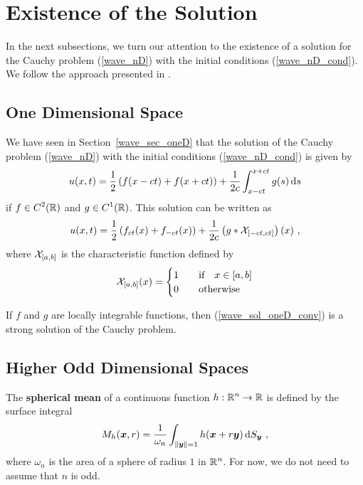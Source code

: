 \section{Existence of the Solution} \label{SectWavenDExSol}

In the next subsections, we turn our attention to the existence of a
solution for the Cauchy problem (\ref{wave_nD}) with the initial conditions
(\ref{wave_nD_cond}).  We follow the approach presented in \cite{FoPDE}.

\subsection{One Dimensional Space}

We have seen in Section~\ref{wave_sec_oneD} that the solution of the
Cauchy problem (\ref{wave_nD}) with the initial conditions
(\ref{wave_nD_cond}) is given by
\[
u(x,t) = \frac{1}{2} \left(f(x-ct) + f(x+ct)\right)
+ \frac{1}{2c} \int_{x-ct}^{x+ct} g(s)\,\mathrm{d}{s}
\]
if $\displaystyle f \in C^2(\mathbb{R})$ and $\displaystyle g \in C^1(\mathbb{R})$.
This solution can be written as
\begin{equation} \label{wave_sol_oneD_conv}
u(x,t) = \frac{1}{2} \left( f_{ct}(x) + f_{-ct}(x) \right) +
\frac{1}{2c} \left(g \ast \mathcal{X}_{[-ct,ct]}\right)(x) \ ,
\end{equation}
where $\mathcal{X}_{[a,b]}$ is the characteristic function defined by
\[
\mathcal{X}_{[a,b]}(x) = \begin{cases}
1 & \quad \text{if} \quad x \in [a,b] \\
0 & \quad \text{otherwise}
\end{cases}
\]

If $f$ and $g$ are locally integrable functions, then
(\ref{wave_sol_oneD_conv}) is a strong solution of the Cauchy problem.

\subsection{Higher Odd Dimensional Spaces} \label{wave_HODS}

The {\bfseries spherical mean} of a continuous function
$\displaystyle h:\mathbb{R}^n\rightarrow \mathbb{R}$ is defined by the surface integral
\begin{equation} \label{wave_nD_idx1}
M_h({\bm{x}},r) = \frac{1}{\omega_n} \int_{\|{\bm{y}}\|=1} h({\bm{x}} + r {\bm{y}}) 
\,\mathrm{d}{S}_{{\bm{y}}} \ ,
\end{equation}
where $\omega_n$ is the area of a sphere of radius $1$ in $\displaystyle \mathbb{R}^n$.
For now, we do not need to assume that $n$ is odd.


